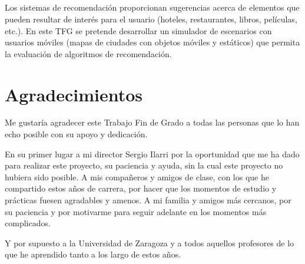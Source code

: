 \chapter*{}

\cleardoublepage
\thispagestyle{empty}

\begin{center}
{\large\bfseries \myTitle}\\
\end{center}

\vspace{0.7cm}
\\

Los sistemas de recomendación proporcionan sugerencias acerca de elementos que pueden resultar de interés para el usuario (hoteles, restaurantes, libros, películas, etc.). En este TFG se pretende desarrollar un simulador de escenarios con usuarios móviles (mapas de ciudades con objetos móviles y estáticos) que permita la evaluación de algoritmos de recomendación. 

\cleardoublepage


\thispagestyle{empty}


\chapter*{Agradecimientos}
\thispagestyle{empty}

       \vspace{1cm}


Me gustaría agradecer este Trabajo Fin de Grado a todas las personas que lo han echo posible con su apoyo y dedicación.

\vspace{1cm}
En su primer lugar a mi director Sergio Ilarri por la oportunidad que me ha dado para realizar este proyecto, su paciencia y ayuda, sin la cual este proyecto no hubiera sido posible. A mis compañeros y amigos de clase, con los que he compartido estos años de carrera, por hacer que los momentos de estudio y prácticas fuesen agradables y amenos. A mi familia y amigos más cercanos, por su paciencia y por motivarme para seguir adelante en los momentos más complicados.

\vspace{1cm}
Y por supuesto a la Universidad de Zaragoza y a todos aquellos profesores de lo que he aprendido tanto a los largo de estos años.

\cleardoublepage

\tableofcontents %

\cleardoublepage
{} %
\listoffigures %

\cleardoublepage
{} %
\listoftables %
